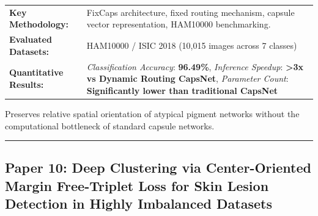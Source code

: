 \documentclass[10pt,a4paper]{article}
\begin{document}
\vspace{4pt}
\begin{tabularx}{\linewidth}{p{3.2cm}X}
\toprule
\textbf{Key Methodology:} & FixCaps architecture, fixed routing mechanism, capsule vector representation, HAM10000 benchmarking. \\
\textbf{Evaluated Datasets:} & HAM10000 / ISIC 2018 (10,015 images across 7 classes) \\
\textbf{Quantitative Results:} & \textit{Classification Accuracy}: \textbf{96.49\%}, \textit{Inference Speedup}: \textbf{>3x vs Dynamic Routing CapsNet}, \textit{Parameter Count}: \textbf{Significantly lower than traditional CapsNet} \\
\bottomrule
\end{tabularx}
\vspace{4pt}
\begin{tcolorbox}[utilitybox,title=Clinical Utility and Real-World Impact]
Preserves relative spatial orientation of atypical pigment networks without the computational bottleneck of standard capsule networks.
\end{tcolorbox}
\vspace{12pt}
\hrule
\vspace{12pt}
\subsection*{Paper 10: Deep Clustering via Center-Oriented Margin Free-Triplet Loss for Skin Lesion Detection in Highly Imbalanced Datasets}
\end{document}
